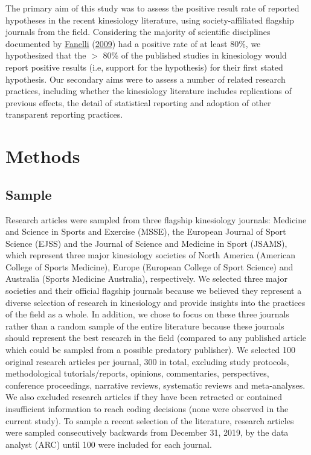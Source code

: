 \documentclass[]{cik}%
\begin{document}
The primary aim of this study was to assess the positive result rate of
reported hypotheses in the recent kinesiology literature, using
society-affiliated flagship journals from the field. Considering the
majority of scientific disciplines documented by
\protect\hyperlink{ref-fanelli_how_2009}{Fanelli}
(\protect\hyperlink{ref-fanelli_how_2009}{2009}) had a positive rate of
at least 80\%, we hypothesized that the \(>\) 80\% of the published
studies in kinesiology would report positive results (i.e, support for
the hypothesis) for their first stated hypothesis. Our secondary aims
were to assess a number of related research practices, including whether
the kinesiology literature includes replications of previous effects,
the detail of statistical reporting and adoption of other transparent
reporting practices.

\hypertarget{methods}{%
\section{Methods}\label{methods}}

\hypertarget{sample}{%
\subsection{Sample}\label{sample}}

Research articles were sampled from three flagship kinesiology journals:
Medicine and Science in Sports and Exercise (MSSE), the European Journal
of Sport Science (EJSS) and the Journal of Science and Medicine in Sport
(JSAMS), which represent three major kinesiology societies of North
America (American College of Sports Medicine), Europe (European College
of Sport Science) and Australia (Sports Medicine Australia),
respectively. We selected three major societies and their official
flagship journals because we believed they represent a diverse selection
of research in kinesiology and provide insights into the practices of
the field as a whole. In addition, we chose to focus on these three
journals rather than a random sample of the entire literature because
these journals should represent the best research in the field (compared
to any published article which could be sampled from a possible
predatory publisher). We selected 100 original research articles per
journal, 300 in total, excluding study protocols, methodological
tutorials/reports, opinions, commentaries, perspectives, conference
proceedings, narrative reviews, systematic reviews and meta-analyses. We
also excluded research articles if they have been retracted or contained
insufficient information to reach coding decisions (none were observed
in the current study). To sample a recent selection of the literature,
research articles were sampled consecutively backwards from December 31,
2019, by the data analyst (ARC) until 100 were included for each
journal.
\end{document}
